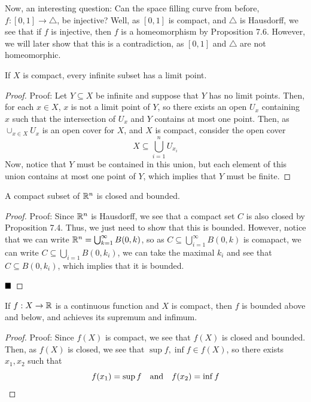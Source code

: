 Now, an interesting question: Can the space filling curve from before, $f : [0, 1] \to \triangle$, be injective? Well, as $[0, 1]$ is compact, and $\triangle$ is Hausdorff, we see that if $f$ is injective, then $f$ is a homeomorphism by Proposition 7.6. However, we will later show that this is a contradiction, as $[0, 1]$ and $\triangle$ are not homeomorphic. 

\begin{lemma}
    If $X$ is compact, every infinite subset has a limit point.
\end{lemma}
\begin{proof}{Proof:}
    Let $Y \subseteq X$ be infinite and suppose that $Y$ has no limit points. Then, for each $x \in X$, $x$ is not a limit point of $Y$, so there exists an open $U_{x}$ containing $x$ such that the intersection of $U_{x}$ and $Y$ contains at most one point. Then, as $\cup_{x \in X} U_{x}$ is an open cover for $X$, and $X$ is compact, consider the open cover
    \[ X \subseteq \bigcup_{i = 1}^{n} U_{x_{i}} \]
    Now, notice that $Y$ must be contained in this union, but each element of this union contains at most one point of $Y$, which implies that $Y$ must be finite. 
\end{proof}

\begin{theorem}
    A compact subset of $\mathbb{R}^n$ is closed and bounded.
\end{theorem}
\begin{proof}{Proof:}
    Since $\mathbb{R}^n$ is Hausdorff, we see that a compact set $C$ is also closed by Proposition 7.4. Thus, we just need to show that this is bounded. However, notice that we can write $\mathbb{R}^n = \bigcup_{k = 1}^{\infty} B(0, k)$, so as $C \subseteq \bigcup_{i = 1}^{\infty} B(0, k)$ is comapact, we can write $C \subseteq \bigcup_{i = 1} B(0, k_{i})$, we can take the maximal $k_{i}$ and see that $C \subseteq B(0, k_{i})$, which implies that it is bounded.

    $\qed$
\end{proof}

\begin{theorem}
    If $f : X \to \mathbb{R}$ is a continuous function and $X$ is compact, then $f$ is bounded above and below, and achieves its supremum and infimum. 
\end{theorem}
\begin{proof}{Proof:}
    Since $f(X)$ is compact, we see that $f(X)$ is closed and bounded. Then, as $f(X)$ is closed, we see that $\sup f, \inf f \in f(X)$, so there exists $x_1, x_2$ such that
    \[ f(x_1) = \sup f \quad \text{and} \quad f(x_2) = \inf f \]
\end{proof}
